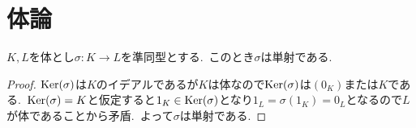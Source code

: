 
\section{体論}

\begin{proposition}
$K,L$を体とし$\sigma \colon K \to L$を準同型とする.\
このとき$\sigma$は単射である.
\end{proposition}

\begin{proof}
$\operatorname{Ker}(\sigma)$は$K$のイデアルであるが$K$は体なので$\operatorname{Ker}(\sigma)$は$(0_K)$または$K$である.\
$\operatorname{Ker}(\sigma) = K$と仮定すると$1_K \in \operatorname{Ker}(\sigma)$となり$1_L = \sigma(1_K) = 0_L$となるので$L$が体であることから矛盾.\
よって$\sigma$は単射である.
\end{proof}
